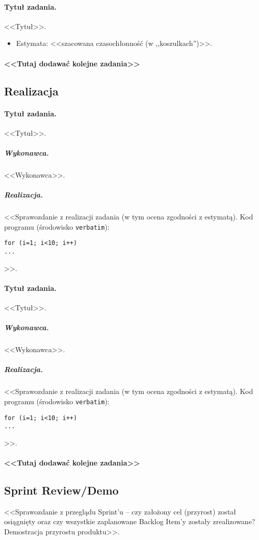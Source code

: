 \documentclass[a4paper]{article}
\begin{document}
\paragraph{Tytuł zadania.} <<Tytuł>>.
\begin{itemize}
\item Estymata: <<szacowana czasochłonność (w ,,koszulkach'')>>.
\end{itemize}

\paragraph{<<Tutaj dodawać kolejne zadania>>}

\subsection{Realizacja} %

\paragraph{Tytuł zadania.} <<Tytuł>>.
\subparagraph{Wykonawca.} <<Wykonawca>>.
\subparagraph{Realizacja.} <<Sprawozdanie z realizacji zadania (w tym ocena zgodności z estymatą). Kod programu (środowisko \texttt{verbatim}): \begin{verbatim}
for (i=1; i<10; i++)
...
\end{verbatim}>>.

\paragraph{Tytuł zadania.} <<Tytuł>>.
\subparagraph{Wykonawca.} <<Wykonawca>>.
\subparagraph{Realizacja.} <<Sprawozdanie z realizacji zadania (w tym ocena zgodności z estymatą). Kod programu (środowisko \texttt{verbatim}): \begin{verbatim}
for (i=1; i<10; i++)
...
\end{verbatim}>>.

\paragraph{<<Tutaj dodawać kolejne zadania>>}


\subsection{Sprint Review/Demo}
<<Sprawozdanie z przeglądu Sprint'u -- czy założony cel (przyrost) został osiągnięty oraz czy wszystkie zaplanowane Backlog Item'y zostały zrealizowane? Demostracja przyrostu produktu>>.
\end{document}
